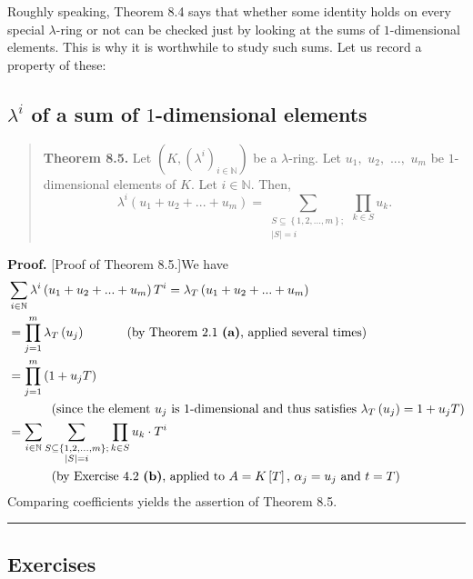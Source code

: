\documentclass[numbers=enddot,12pt,final,onecolumn,notitlepage]{scrartcl}%
\newenvironment{proof}[1][Proof]{\noindent\textbf{#1.} }{\ \rule{0.5em}{0.5em}}
\begin{document}
Roughly speaking, Theorem 8.4 says that whether some identity holds on every
special $\lambda$-ring or not can be checked just by looking at the sums of
$1$-dimensional elements. This is why it is worthwhile to study such sums. Let
us record a property of these:

\subsection{$\lambda^{i}$ of a sum of $1$-dimensional elements}

\begin{quote}
\textbf{Theorem 8.5.} Let $\left(  K,\left(  \lambda^{i}\right)
_{i\in\mathbb{N}}\right)  $ be a $\lambda$-ring. Let $u_{1},$ $u_{2},$ $...,$
$u_{m}$ be $1$-dimensional elements of $K$. Let $i\in\mathbb{N}$. Then,%
\[
\lambda^{i}\left(  u_{1}+u_{2}+...+u_{m}\right)  =\sum_{\substack{S\subseteq
\left\{  1,2,...,m\right\}  ;\\\left\vert S\right\vert =i}}\prod_{k\in S}%
u_{k}.
\]



\end{quote}

\begin{proof}
[Proof of Theorem 8.5.]We have%
\begin{align*}
&  \sum_{i\in\mathbb{N}}\lambda^{i}\left(  u_{1}+u_{2}+...+u_{m}\right)
T^{i}=\lambda_{T}\left(  u_{1}+u_{2}+...+u_{m}\right) \\
&  =\prod_{j=1}^{m}\lambda_{T}\left(  u_{j}\right)
\ \ \ \ \ \ \ \ \ \ \left(  \text{by Theorem 2.1 \textbf{(a)}, applied several
times}\right) \\
&  =\prod_{j=1}^{m}\left(  1+u_{j}T\right) \\
&  \ \ \ \ \ \ \ \ \ \ \left(  \text{since the element }u_{j}\text{ is
}1\text{-dimensional and thus satisfies }\lambda_{T}\left(  u_{j}\right)
=1+u_{j}T\right) \\
&  =\sum_{i\in\mathbb{N}}\sum\limits_{\substack{S\subseteq\left\{
1,2,...,m\right\}  ;\\\left\vert S\right\vert =i}}\prod\limits_{k\in S}%
u_{k}\cdot T^{i}\\
&  \ \ \ \ \ \ \ \ \ \ \left(  \text{by Exercise 4.2 \textbf{(b)}, applied to
}A=K\left[  T\right]  \text{, }\alpha_{j}=u_{j}\text{ and }t=T\right)
\end{align*}
Comparing coefficients yields the assertion of Theorem 8.5.
\end{proof}

\subsection{Exercises}
\end{document}
